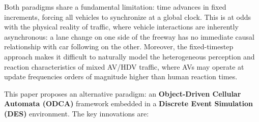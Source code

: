 \documentclass[review,number]{elsarticle}
\begin{document}
Both paradigms share a fundamental limitation: time advances in fixed increments, forcing all vehicles to synchronize at a global clock. This is at odds with the physical reality of traffic, where vehicle interactions are inherently asynchronous: a lane change on one side of the freeway has no immediate causal relationship with car following on the other. Moreover, the fixed-timestep approach makes it difficult to naturally model the heterogeneous perception and reaction characteristics of mixed AV/HDV traffic, where AVs may operate at update frequencies orders of magnitude higher than human reaction times.

This paper proposes an alternative paradigm: an \textbf{Object-Driven Cellular Automata (ODCA)} framework embedded in a \textbf{Discrete Event Simulation (DES)} environment. The key innovations are:
\end{document}
